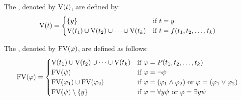 \begin{definition}
	The , denoted by $\text{V}(t)$, are defined by:
	\[\V(t)=
		\begin{cases}
			\{y\}                                    & \text{if $t=y$}                    \\ %
			\V(t_1)\cup \V(t_2)\cup\dots\cup \V(t_k) & \text{if $t=f(t_1,t_2,\dots,t_k)$} 
		\end{cases}\]
	
	The , denoted by $\text{FV}(\varphi)$, are defined as follows:
	\[\FV(\varphi)=
		\begin{cases} %
			\V(t_1)\cup \V(t_2)\cup\dots\cup \V(t_k) & \text{if $\varphi=P(t_1,t_2,\dots,t_k)$}                               \\
			\FV(\psi)                                 & \text{if $\varphi=\neg\psi$}                               \\
			\FV(\varphi_1)\cup\FV(\varphi_2)         & \text{if $\varphi=(\varphi_1\wedge\varphi_2)$ or $\varphi=(\varphi_1\vee\varphi_2)$} \\
			\FV(\psi)\setminus\{y\}                  & \text{if $\varphi=\forall y\psi$ or $\varphi=\exists y\psi$}                 
		\end{cases}\]
\end{definition}


